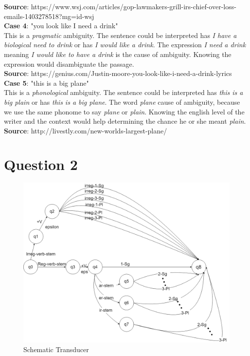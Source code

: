 \documentclass[10pt]{article}
\begin{document}
\textbf{Source}: https://www.wsj.com/articles/gop-lawmakers-grill-irs-chief-over-loss-emails-1403278518?mg=id-wsj\\

\textbf{Case 4}: "you look like I need a drink"\\

This is a \textit{pragmatic} ambiguity. The sentence could be interpreted has \textit{I have a biological need to drink} or has \textit{I would like a drink}. The expression \textit{I need a drink} meaning \textit{I would like to have a drink} is the cause of ambiguity. Knowing the expression would disambiguate the passage.\\

\textbf{Source}: https://genius.com/Justin-moore-you-look-like-i-need-a-drink-lyrics\\

\textbf{Case 5}: "this is a big plane"\\

This is a \textit{phonological} ambiguity. The sentence could be interpreted has \textit{this is a big plain} or has \textit{this is a big plane}. The word \textit{plane} cause of ambiguity, because we use the same phonome to say \textit{plane} or \textit{plain}. Knowing the english level of the writer and the context would help determining the chance he or she meant \textit{plain}. \\

\textbf{Source}: http://livestly.com/new-worlds-largest-plane/\\

\section*{Question 2}
\begin{figure}[h!]
    \centering
    \includegraphics[scale=0.25]{schematic_transducer.png}
    \caption{Schematic Transducer}
    \label{fig:boat1}
\end{figure}
\end{document}
